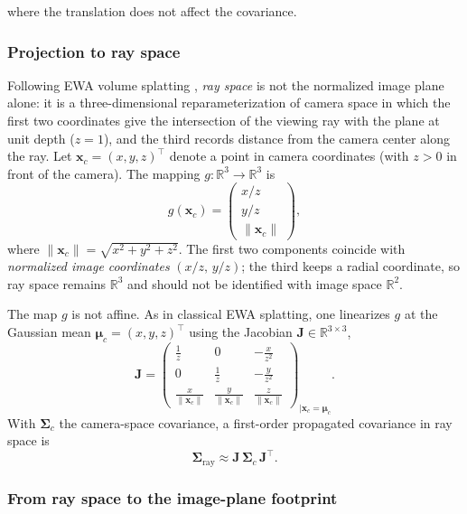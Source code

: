 \documentclass{report}
\begin{document}
where the translation does not affect the covariance.

\subsubsection{Projection to ray space}

Following EWA volume splatting \cite{zwicker2002ewa}, \emph{ray space} is not the normalized image plane alone: it is a three-dimensional reparameterization of camera space in which the first two coordinates give the intersection of the viewing ray with the plane at unit depth ($z=1$), and the third records distance from the camera center along the ray. Let $\mathbf{x}_c=(x,y,z)^\top$ denote a point in camera coordinates (with $z>0$ in front of the camera). The mapping $g:\mathbb{R}^3\to\mathbb{R}^3$ is
\[
g(\mathbf{x}_c)=
\begin{pmatrix}
x/z \\[2pt]
y/z \\[2pt]
\|\mathbf{x}_c\|
\end{pmatrix},
\]
where $\|\mathbf{x}_c\|=\sqrt{x^2+y^2+z^2}$. The first two components coincide with \emph{normalized image coordinates} $(x/z,\,y/z)$; the third keeps a radial coordinate, so ray space remains $\mathbb{R}^3$ and should not be identified with image space $\mathbb{R}^2$.

The map $g$ is not affine. As in classical EWA splatting, one linearizes $g$ at the Gaussian mean $\boldsymbol{\mu}_c=(x,y,z)^\top$ using the Jacobian $\mathbf{J}\in\mathbb{R}^{3\times 3}$,
\[
\mathbf{J}=
\begin{pmatrix}
\frac{1}{z} & 0 & -\frac{x}{z^2} \\[4pt]
0 & \frac{1}{z} & -\frac{y}{z^2} \\[4pt]
\frac{x}{\|\mathbf{x}_c\|} & \frac{y}{\|\mathbf{x}_c\|} & \frac{z}{\|\mathbf{x}_c\|}
\end{pmatrix}_{\Big|\mathbf{x}_c=\boldsymbol{\mu}_c}.
\]
With $\boldsymbol{\Sigma}_c$ the camera-space covariance, a first-order propagated covariance in ray space is
\[
\boldsymbol{\Sigma}_{\mathrm{ray}} \approx \mathbf{J}\,\boldsymbol{\Sigma}_c\,\mathbf{J}^\top.
\]

\subsubsection{From ray space to the image-plane footprint}
\end{document}

